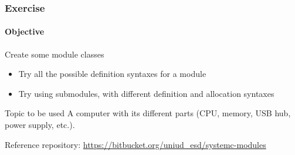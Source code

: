 \begin{frame}
\frametitle{Exercise}
\framesubtitle{Objective}

\begin{block}{Create some module classes}
\begin{itemize}
\item Try all the possible definition syntaxes for a module
\item Try using submodules, with different definition and allocation syntaxes
\end{itemize}
\end{block}
\pause
\begin{block}{Topic to be used}
A computer with its different parts (CPU, memory, USB hub, power supply, etc.).
\end{block}
\pause
\begin{block}{Reference repository:}
\url{https://bitbucket.org/uniud_esd/systemc-modules}
\end{block}
\end{frame}
